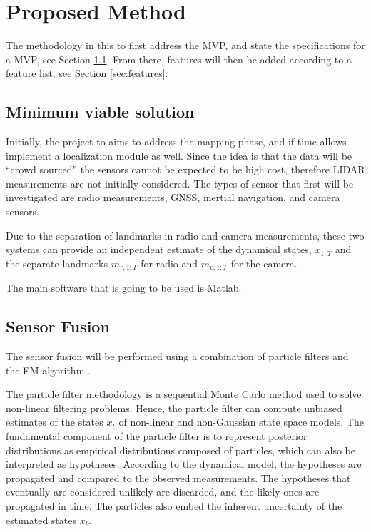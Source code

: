 \section{Proposed Method}

The methodology in this to first address the \gls{MVP}, and state the
specifications for a \gls{MVP}, see Section \ref{sec:mvs}. From there, features
will then be added
according to a feature list, see Section \ref{sec:features}.

\subsection{Minimum viable solution}\label{sec:mvs}

Initially, the project to aims to address the mapping phase, and if time allows
implement a localization module as well. Since the idea is that the data will
be ``crowd sourced'' the sensors cannot be expected to be high cost, therefore
\gls{LIDAR} measurements are not initially considered. The types of sensor that
first will be investigated are radio measurements, \gls{GNSS}, inertial
navigation, and camera sensors.

Due to the separation of landmarks in radio and camera measurements, these two
systems can provide an independent estimate of the dynamical states, $x_{1:T}$
and the separate landmarks $m_{r,1:T}$ for radio and $m_{v,1:T}$ for the
camera.

The main software that is going to be used is Matlab.

\subsection{Sensor Fusion}

The sensor fusion will be performed using a combination of particle
filters and the \gls{EM} algorithm
\cite{DBLP:journals/automatica/SchonWN11}.

The particle filter
\cite{210672} methodology is a sequential Monte Carlo method used to
solve non-linear filtering problems. Hence, the particle filter can
compute unbiased estimates of the
states $x_{t}$  of non-linear and non-Gaussian state space models. The
fundamental component of the particle filter is to represent posterior
distributions as empirical distributions composed of particles, which
can also be interpreted as hypotheses. According to the dynamical
model, the hypotheses are propagated and
compared to the observed measurements. The hypotheses that eventually
are considered unlikely are discarded, and the likely ones are
propagated in time. The particles also embed the inherent uncertainty
of the estimated states $x_t$.

